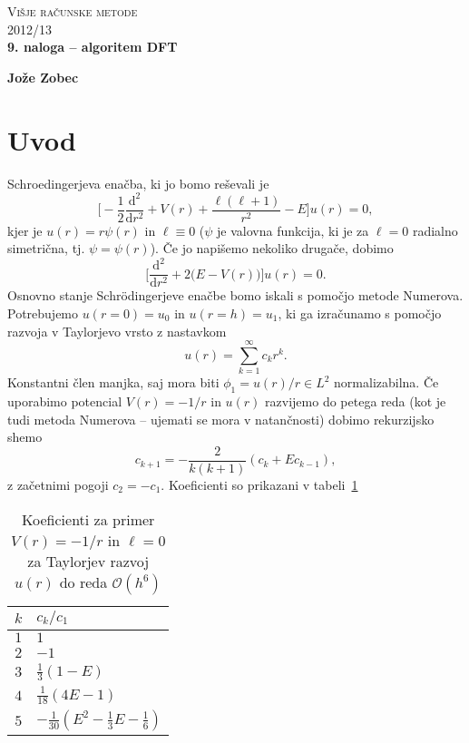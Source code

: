 \documentclass[12pt, a4 paper]{article}
\renewcommand{\d}{
	\ensuremath{\mathrm{d}}
}
\begin{document}
\begin{center}
\textsc{Vi\v sje ra\v cunske metode}\\
\textsc{2012/13}\\[0.5cm]
\textbf{9. naloga -- algoritem DFT}
\end{center}
\begin{flushright}
\textbf{Jo\v ze Zobec}
\end{flushright}

\section{Uvod}

Schroedingerjeva ena\v cba, ki jo bomo re\v sevali je
\[
	\bigg[-\frac{1}{2}\frac{\d^2}{\d r^2} + V(r) + \frac{\ell(\ell+1)}{r^2} - E\bigg]u(r) = 0,
\]
kjer je $u(r) = r\psi(r)$ in $\ell \equiv 0$ ($\psi$ je valovna funkcija, ki je za $\ell = 0$ radialno simetri\v cna, tj.
$\psi = \psi(r)$). \v Ce jo napi\v semo nekoliko druga\v ce, dobimo
\begin{equation}
	\bigg[\frac{\d^2}{\d r^2} + 2\Big(E - V(r)\Big)\bigg]u(r) = 0.
\end{equation}
Osnovno stanje Schr\" odingerjeve ena\v cbe bomo iskali s pomo\v cjo metode Numerova. Potrebujemo $u(r=0) = u_0$ in
$u (r = h) = u_1$, ki ga izra\v cunamo s pomo\v cjo razvoja v Taylorjevo vrsto z nastavkom
\[
	u(r) = \sum_{k = 1}^{\infty} c_k r^k.	
\]
Konstantni \v clen manjka, saj mora biti $\phi_1 = u(r)/r \in L^2$ normalizabilna. \v Ce uporabimo potencial 
$V(r) = -1/r$ in $u(r)$ razvijemo do petega reda (kot je tudi metoda Numerova -- ujemati se mora v
natan\v cnosti) dobimo rekurzijsko shemo
\[
	c_{k+1} = -\frac{2}{k(k+1)}(c_k + Ec_{k-1}),
\]
z za\v cetnimi pogoji $c_2 = -c_1$. Koeficienti so prikazani v tabeli~\ref{tab:koef}
\begin{table}[H]\centering
	\caption{Koeficienti za primer $V(r) = -1/r$ in $\ell = 0$ za Taylorjev razvoj $u(r)$ do reda
	$\mathcal{O}(h^6)$}
	\vspace{6pt}
	\begin{tabular}{c|l}
		$k$ & $c_k/c_1$ \\
		\hline
		$1$ & $1$ \\
		$2$ & $-1$ \\
		$3$ & $\frac{1}{3}(1 - E)$ \\
		$4$ & $\frac{1}{18}(4E - 1)$ \\
		$5$ & $-\frac{1}{30}(E^2 - \frac{1}{3}E - \frac{1}{6})$
	\end{tabular}
	\label{tab:koef}
\end{table}
\end{document}
